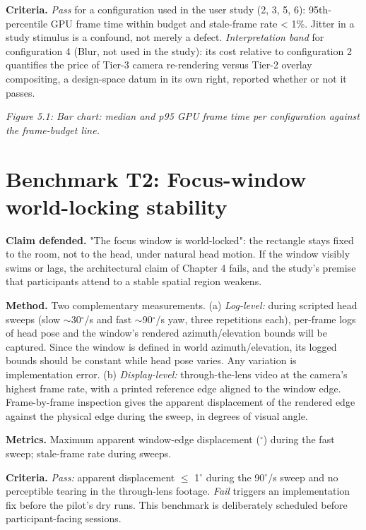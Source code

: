 \textbf{Criteria.} \textit{Pass} for a configuration used in the user study (2, 3, 5, 6): 95th-percentile GPU
frame time within budget and stale-frame rate < 1\%. Jitter in a study stimulus is a confound, not
merely a defect. \textit{Interpretation band} for configuration 4 (Blur, not used in the study): its cost
relative to configuration 2 quantifies the price of Tier-3 camera re-rendering versus Tier-2
overlay compositing, a design-space datum in its own right, reported whether or not it passes.

\textit{Figure 5.1: Bar chart: median and p95 GPU frame time per configuration against the frame-budget
line.}

\section{Benchmark T2: Focus-window world-locking stability}

\textbf{Claim defended.} "The focus window is world-locked": the rectangle stays fixed to the room, not
to the head, under natural head motion. If the window visibly swims or lags, the architectural
claim of Chapter 4 fails, and the study's premise that participants attend to a stable spatial
region weakens.

\textbf{Method.} Two complementary measurements. (a) \textit{Log-level:} during scripted head sweeps
(slow $\sim$30$^{\circ}$/s and fast $\sim$90$^{\circ}$/s yaw, three repetitions each), per-frame logs of head pose and the
window's rendered azimuth/elevation bounds will be captured. Since the window is defined in world
azimuth/elevation, its logged bounds should be constant while head pose varies. Any variation is
implementation error. (b) \textit{Display-level:} through-the-lens video at the camera's highest frame
rate, with a printed reference edge aligned to the window edge. Frame-by-frame inspection gives the
apparent displacement of the rendered edge against the physical edge during the sweep, in degrees
of visual angle.

\textbf{Metrics.} Maximum apparent window-edge displacement ($^{\circ}$) during the fast sweep; stale-frame rate
during sweeps.

\textbf{Criteria.} \textit{Pass:} apparent displacement $\leq$ 1$^{\circ}$ during the 90$^{\circ}$/s sweep and no perceptible tearing
in the through-lens footage. \textit{Fail} triggers an implementation fix before the pilot's dry runs.
This benchmark is deliberately scheduled before participant-facing sessions.

